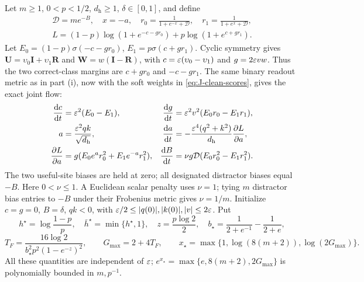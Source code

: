 Let $m\ge1$, $0<p<1/2$, $d_{\mathrm h}\ge1$, $\delta\in[0,1]$, and define
\[
 \begin{gathered}
 \mathcal D=me^{-B},\quad x=-a,\quad
 r_0=\frac1{1+e^{-x}+\mathcal D},\quad r_1=\frac1{1+e^x+\mathcal D},\\
 L=(1-p)\log(1+e^{-c-gr_0})+p\log(1+e^{c+gr_1}).
 \end{gathered}
\]
Let $E_0=(1-p)\sigma(-c-gr_0)$, $E_1=p\sigma(c+gr_1)$.
Cyclic symmetry gives $\mathbf U=\upsilon_0\mathbf I+\upsilon_1\mathbf R$ and $\mathbf W=w(\mathbf I-\mathbf R)$, with
$c=\varepsilon(\upsilon_0-\upsilon_1)$ and $g=2\varepsilon vw$. Thus the two correct-class margins are $c+gr_0$ and $-c-gr_1$.
The same binary readout metric as in part (i), now with the soft weights in \cref{eq:J-clean-scores}, gives the exact joint flow:
\begin{align*}
 \ddt{c}&=\initscale^2(E_0-E_1),&
 \ddt{g}&=\initscale^2v^2(E_0r_0-E_1r_1),\\
 a&=\frac{\initscale^2qk}{\sqrt{d_{\mathrm h}}},&
 \ddt{a}&=-\frac{\initscale^4(q^2+k^2)}{d_{\mathrm h}}\pd{L}{a},\\
 \pd{L}{a}&=g(E_0e^a r_0^2+E_1e^{-a}r_1^2),&
 \ddt{B}&=\nu g\mathcal D(E_0r_0^2-E_1r_1^2).
\end{align*}
The two useful-site biases are held at zero; all designated distractor biases equal $-B$.
Here $0<\nu\le1$. A Euclidean scalar penalty uses $\nu=1$; tying $m$ distractor bias entries to $-B$ under their Frobenius metric gives $\nu=1/m$.
Initialize $c=g=0$, $B=\delta$, $qk<0$, with
$\varepsilon/2\le |q(0)|,|k(0)|,|v|\le2\varepsilon$.
Put
\begin{equation}
 h^\star=\log\frac{1-p}{p},\quad \bar h^\star=\min\{h^\star,1\},\quad
 z=\frac{p\log2}{2},\quad
 b_\star=\frac1{2+e^{-1}}-\frac1{2+e},
\end{equation}
\begin{equation}
 T_F=\frac{16\log2}{b_\star^2p^2(1-e^{-z})^2},\qquad
 G_{\max}=2+4T_F,\qquad x_\star=\max\{1,\log(8(m+2)),\log(2G_{\max})\}.
 \label{eq:CR-constants}
\end{equation}
All these quantities are independent of $\varepsilon$; $e^{x_\star}=\max\{e,8(m+2),2G_{\max}\}$ is polynomially bounded in $m,p^{-1}$.


